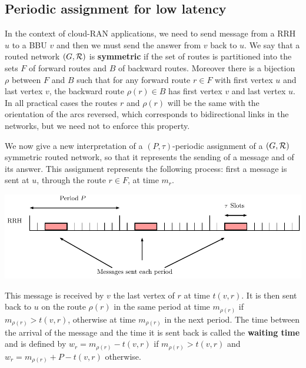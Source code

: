 \documentclass[a4paper,10pt]{article}
\begin{document}
      
      \subsection{Periodic assignment for low latency}
      In the context of cloud-RAN applications, we need to send message from a RRH $u$ to a BBU $v$ and then 
      we must send the answer from $v$ back to $u$. We say that a routed network $(G, {\cal R})$ is \textbf{symmetric} if the set of routes is partitioned into the sets $F$ of forward routes and $B$ of backward routes. Moreover there is a bijection $\rho$ between $F$ and $B$ such that for any forward route $r \in F$ with first vertex $u$ and last vertex $v$, the backward route $\rho(r) \in B$ has first vertex $v$ and last vertex $u$. In all practical cases the routes $r$ and $\rho(r)$ will be the same with the orientation of the arcs reversed, which corresponds to bidirectional links in the networks, but we need not to enforce this property.
         
         We now give a new interpretation of a $(P,\tau)$-periodic assignment of a $(G,{\cal R})$ symmetric routed network, so that it represents the sending of a message and of its answer.
	This assignment represents the following process: first a message is sent at $u$, through the route $r \in F$, at time $m_r$.
       
      
      
      \begin{center}
      \includegraphics[width=\textwidth]{rrh.pdf}
      \end{center}
      
      

      This message is received by $v$ the last vertex of $r$ at time $t(v,r)$. It is then sent back to $u$ on the route $\rho(r)$ in the same period at time $m_{\rho(r)}$ if $m_{\rho(r)} > t(v,r)$, otherwise at time $m_{\rho(r)}$ in the next period. The time between the arrival of the message and the time it is sent back is called the \textbf{waiting time} and is defined by $w_r = m_{\rho(r)} - t(v,r)$ if $m_{\rho(r)} > t(v,r)$ and $w_r = m_{\rho(r)} + P - t(v,r)$ otherwise.
 
\end{document}
